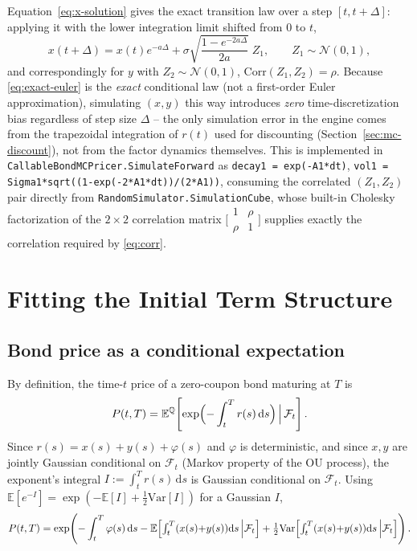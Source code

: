 \documentclass[11pt,a4paper]{article}
\newcommand{\dd}{\mathrm{d}}
\newcommand{\E}{\mathbb{E}}
\newcommand{\Q}{\mathbb{Q}}
\newcommand{\N}{\mathcal{N}}
\newcommand{\F}{\mathcal{F}}
\newcommand{\Var}{\mathrm{Var}}
\newcommand{\coderef}[1]{\texttt{\color{blue!60!black}#1}}
\theoremstyle{definition}
\begin{document}
Equation~\eqref{eq:x-solution} gives the exact transition law over a step
$[t,t+\Delta]$: applying it with the lower integration limit shifted from $0$
to $t$,
\begin{equation}
  x(t+\Delta) = x(t)e^{-a\Delta}
              + \sigma\sqrt{\frac{1-e^{-2a\Delta}}{2a}}\;Z_1,
  \qquad Z_1\sim\N(0,1),
  \label{eq:exact-euler}
\end{equation}
and correspondingly for $y$ with $Z_2\sim\N(0,1)$, $\mathrm{Corr}(Z_1,Z_2)=\rho$.
Because \eqref{eq:exact-euler} is the \emph{exact} conditional law (not a
first-order Euler approximation), simulating $(x,y)$ this way introduces
\emph{zero} time-discretization bias regardless of step size $\Delta$ --
the only simulation error in the engine comes from the trapezoidal
integration of $r(t)$ used for discounting (Section~\ref{sec:mc-discount}),
not from the factor dynamics themselves. This is implemented in
\coderef{CallableBondMCPricer.SimulateForward} as
\lstinline{decay1 = exp(-A1*dt)}, \lstinline{vol1 = Sigma1*sqrt((1-exp(-2*A1*dt))/(2*A1))},
consuming the correlated $(Z_1,Z_2)$ pair directly from
\coderef{RandomSimulator.SimulationCube}, whose built-in Cholesky
factorization of the $2\times2$ correlation matrix $\bigl[\begin{smallmatrix}1&\rho\\\rho&1\end{smallmatrix}\bigr]$
supplies exactly the correlation required by \eqref{eq:corr}.

\section{Fitting the Initial Term Structure}
\label{sec:phi}

\subsection{Bond price as a conditional expectation}

By definition, the time-$t$ price of a zero-coupon bond maturing at $T$ is
\begin{equation}
  P(t,T) = \E^\Q\!\left[\exp\Bigl(-\int_t^T r(s)\,\dd s\Bigr)\,\Big|\,\F_t\right].
  \label{eq:bond-def}
\end{equation}
Since $r(s)=x(s)+y(s)+\varphi(s)$ and $\varphi$ is deterministic, and since
$x,y$ are jointly Gaussian conditional on $\F_t$ (Markov property of the OU
process), the exponent's integral $I:=\int_t^T r(s)\,\dd s$ is Gaussian
conditional on $\F_t$. Using $\E[e^{-I}]=\exp(-\E[I]+\tfrac12\Var[I])$ for a
Gaussian $I$,
\begin{equation}
  P(t,T) = \exp\!\left(-\int_t^T\varphi(s)\,\dd s
                        - \E\Bigl[\textstyle\int_t^T(x(s){+}y(s))\dd s\,\Big|\F_t\Bigr]
                        + \tfrac12\Var\Bigl[\textstyle\int_t^T(x(s){+}y(s))\dd s\,\Big|\F_t\Bigr]\right).
  \label{eq:bond-gaussian}
\end{equation}
\end{document}
